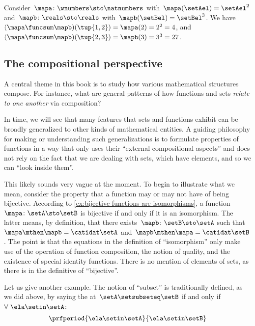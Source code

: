 \begin{example}
    Consider~$\mapa\colon \wnumbers \sto \natnumbers$ with~$\mapa(\setAel)=\setAel^2$ and~$\mapb\colon \reals \sto \reals$ with~$\mapb(\setBel)=\setBel^3$.
    We have~$(\mapa \funcsum \mapb)(\tup{1,2})=\mapa(2)=2^2=4$, and~$(\mapa \funcsum \mapb)(\tup{2,3})=\mapb(3)=3^3 = 27$.
\end{example}

\subsection{The compositional perspective}

A central theme in this book is to study how various mathematical structures compose.
For instance, what are general patterns of how functions and sets \emph{relate to one another} via composition?

In time, we will see that many features that sets and functions exhibit can be broadly generalized to other kinds of mathematical entities.
A guiding philosophy for making or understanding such generalizations is to formulate properties of functions in a way that only uses their ``external compositional aspects'' and does not rely on the fact that we are dealing with sets, which have elements, and so we can ``look inside them''.

This likely sounds very vague at the moment.
To begin to illustrate what we mean, consider the property that a function may or may not have of being bijective.
According to \cref{ex:bijective-functions-are-isomorphisms}, a function~$\mapa\colon \setA \sto \setB$ is bijective if and only if it is an isomorphism.
The latter means, by definition, that there exists~$\mapb \colon \setB \sto \setA$ such that~$\mapa \mthen \mapb = \catidat\setA$ and~$\mapb \mthen \mapa = \catidat\setB$.
The point is that the equations in the definition of ``isomorphism'' only make use of the operation of function composition, the notion of quality, and the existence of special identity functions.
There is no mention of elements of sets, as there is in the definitive of ``bijective''.

Let us give another example.
The notion of ``subset'' is traditionally defined, as we did above, by saying the at~$\setA \setsubseteq \setB$ if and only if~$\forall \ \ela \setin\setA$:
\begin{equation}
    \prfperiod{
        \ela \setin\setA
    }{
        \ela \setin\setB
    }
\end{equation}

